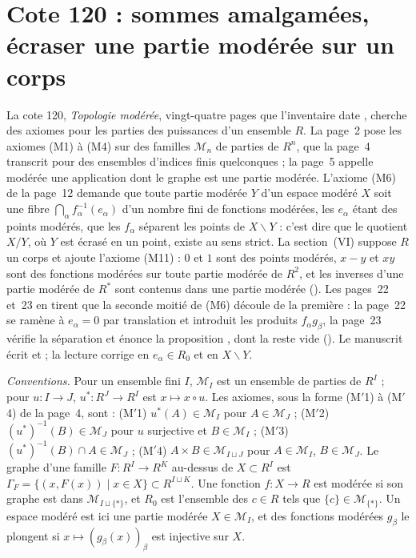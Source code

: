 \section[Cote 120 : sommes amalgamées, écraser une partie modérée sur un corps]{Cote 120 : sommes amalgamées, écraser une partie modérée sur un corps\protect{}}\label{sec:120}

La cote 120, \emph{Topologie modérée}, vingt-quatre pages que l'inventaire date , cherche des axiomes pour les parties  des puissances d'un ensemble $R$. La page~2 pose les axiomes (M1) à (M4) sur des familles $\mathcal M_n$ de parties de $R^n$, que la page~4 transcrit pour des ensembles d'indices finis quelconques ; la page~5 appelle modérée une application dont le graphe est une partie modérée. L'axiome (M6) de la page~12 demande que toute partie modérée $Y$ d'un espace modéré $X$ soit une fibre $\bigcap_\alpha f_\alpha^{-1}(e_\alpha)$ d'un nombre fini de fonctions modérées, les $e_\alpha$ étant des points modérés,  que les $f_\alpha$ séparent les points de $X \smallsetminus Y$ : c'est dire que le quotient $X/Y$, où $Y$ est écrasé en un point, existe au sens strict. La section~(VI) suppose $R$ un corps et ajoute l'axiome (M11) : $0$ et $1$ sont des points modérés, $x - y$ et $xy$ sont des fonctions modérées sur toute partie modérée de $R^2$, et les inverses d'une partie modérée de $R^*$ sont contenus dans une partie modérée (). Les pages~22 et~23 en tirent que la seconde moitié de (M6) découle de la première : la page~22 se ramène à $e_\alpha = 0$ par translation et introduit les produits $f_\alpha g_\beta$, la page~23 vérifie la séparation et énonce la proposition , dont la  reste vide (). Le manuscrit écrit  et  ; la lecture corrige en $e_\alpha \in R_0$ et en $X \smallsetminus Y$.

\noindent\emph{Conventions.} Pour un ensemble fini $I$, $\mathcal M_I$ est un ensemble de parties de $R^I$ ; pour $u : I \to J$, $u^* : R^J \to R^I$ est $x \mapsto x \circ u$. Les axiomes, sous la forme (M$'$1) à (M$'$4) de la page~4, sont : (M$'$1) $u^*(A) \in \mathcal M_I$ pour $A \in \mathcal M_J$ ; (M$'$2) $(u^*)^{-1}(B) \in \mathcal M_J$ pour $u$ surjective et $B \in \mathcal M_I$ ; (M$'$3) $(u^*)^{-1}(B) \cap A \in \mathcal M_J$ ; (M$'$4) $A \times B \in \mathcal M_{I \sqcup J}$ pour $A \in \mathcal M_I$, $B \in \mathcal M_J$. Le graphe d'une famille $F : R^I \to R^K$ au-dessus de $X \subset R^I$ est $\Gamma_F = \{(x, F(x)) \mid x \in X\} \subset R^{I \sqcup K}$. Une fonction $f : X \to R$ est modérée si son graphe est dans $\mathcal M_{I \sqcup \{\ast\}}$, et $R_0$ est l'ensemble des $c \in R$ tels que $\{c\} \in \mathcal M_{\{\ast\}}$. Un espace modéré est ici une partie modérée $X \in \mathcal M_I$, et des fonctions modérées $g_\beta$ le plongent si $x \mapsto (g_\beta(x))_\beta$ est injective sur $X$.

